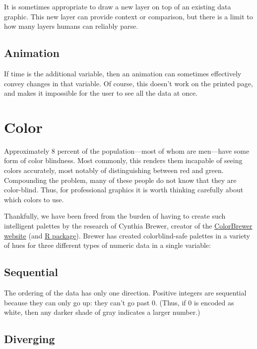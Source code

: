 \documentclass[]{book}
\theoremstyle{definition}
\theoremstyle{definition}
\theoremstyle{definition}
\theoremstyle{remark}
\begin{document}
It is sometimes appropriate to draw a new layer on top of an existing
data graphic. This new layer can provide context or comparison, but
there is a limit to how many layers humans can reliably parse.

\subsection{Animation}\label{animation}

If time is the additional variable, then an animation can sometimes
effectively convey changes in that variable. Of course, this doesn't
work on the printed page, and makes it impossible for the user to see
all the data at once.

\section{Color}\label{color}

Approximately 8 percent of the population---most of whom are men---have
some form of color blindness. Most commonly, this renders them incapable
of seeing colors accurately, most notably of distinguishing between red
and green. Compounding the problem, many of these people do not know
that they are color-blind. Thus, for professional graphics it is worth
thinking carefully about which colors to use.

Thankfully, we have been freed from the burden of having to create such
intelligent palettes by the research of Cynthia Brewer, creator of the
\href{http://colorbrewer2.org/learnmore/schemes_full.html}{ColorBrewer
website} (and
\href{https://cran.r-project.org/web/packages/RColorBrewer/index.html}{R
package}). Brewer has created colorblind-safe palettes in a variety of
hues for three different types of numeric data in a single variable:

\subsection{Sequential}\label{sequential}

The ordering of the data has only one direction. Positive integers are
sequential because they can only go up: they can't go past 0. (Thus, if
0 is encoded as white, then any darker shade of gray indicates a larger
number.)

\subsection{Diverging}\label{diverging}
\end{document}
